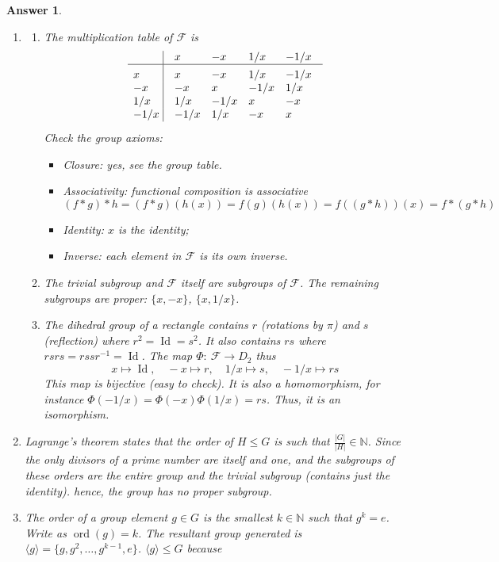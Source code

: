 \documentclass[a4paper]{article}
\DeclareMathOperator{\ord}{ord}
\DeclareMathOperator{\Id}{Id}
\newtheorem{ans}{Answer}[section]
\theoremstyle{new}
\begin{document}
\newpage
\begin{ans}\leavevmode
\begin{enumerate}[label=(\roman*)]
\item 
\begin{enumerate}[label=(\alph*)]
\item The multiplication table of $\mathcal{F}$ is
$$\vbox{\tabskip0.5em\offinterlineskip
    \halign{\strut$#$\hfil\ \tabskip1em\vrule&&$#$\hfil\cr
    ~   & x & -x &1/x&-1/x \cr
    \noalign{\hrule}\vrule height 12pt width 0pt
    x & x & -x &1/x&-1/x \cr
    -x & -x & x &-1/x & 1/x \cr
    1/x & 1/x & -1/x & x &-x \cr
    -1/x & -1/x &1/x & -x & x\cr
}}$$
Check the group axioms:
\begin{itemize}
    \item Closure: yes, see the group table.
    \item Associativity: functional composition is associative
    $$(f*g)*h=(f*g)(h(x))=f(g)(h(x))=f((g*h))(x)=f*(g*h)$$
    \item Identity: $x$ is the identity;
    \item Inverse: each element in $\mathcal{F}$ is its own inverse.
\end{itemize}
\item The trivial subgroup and $\mathcal{F}$ itself are subgroups of $\mathcal{F}$. The remaining subgroups are proper: $\{x,-x\}$, $\{x,1/x\}$.
\item The dihedral group of a rectangle contains $r$ (rotations by $\pi$) and $s$ (reflection) where $r^2=\Id=s^2$. It also contains $rs$ where $rsrs=rssr^{-1}=\Id$. The map $\Phi:~\mathcal{F}\rightarrow D_2$ thus
$$x\mapsto\Id,\quad -x\mapsto r,\quad 1/x\mapsto s,\quad -1/x\mapsto rs$$
This map is bijective (easy to check). It is also a homomorphism, for instance $\Phi(-1/x)=\Phi(-x)\Phi(1/x)=rs$. Thus, it is an isomorphism.
\end{enumerate}
\item Lagrange's theorem states that the order of $H\leq G$ is such that $\frac{|G|}{|H|}\in\mathbb{N}$. Since the only divisors of a prime number are itself and one, and the subgroups of these orders are the entire group and the trivial subgroup (contains just the identity). hence, the group has no proper subgroup.
\item The order of a group element $g\in G$ is the smallest $k\in\mathbb{N}$ such that $g^k=e$. Write as $\ord(g)=k$. The resultant group generated is $\langle g\rangle=\{g,g^2,\dots,g^{k-1},e\}$. $\langle g\rangle\leq G$ because
\begin{itemize}

\end{itemize}
\end{enumerate}
\end{ans}
\end{document}
